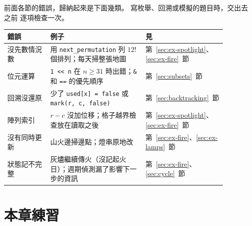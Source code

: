 前面各節的錯誤，歸納起來是下面幾類。 寫枚舉、回溯或模擬的題目時，交出去之前
逐項檢查一次。

\begin{center}
\begin{tabular}{p{0.2\linewidth}p{0.44\linewidth}p{0.24\linewidth}}
\toprule
錯誤 & 例子 & 見 \\
\midrule
沒先數情況數 & 用 \texttt{next\_permutation} 列 $12!$ 個排列；每天掃整張地圖
& 第~\ref{sec:ex-spotlight}、\ref{sec:ex-fire}~節 \\
位元運算 & \texttt{1 << n} 在 $n \ge 31$ 時出錯；\texttt{\&} 和 \texttt{==}
的優先順序 & 第~\ref{sec:subsets}~節 \\
回溯沒還原 & 少了 \texttt{used[x] = false} 或 \texttt{mark(r, c, false)} &
第~\ref{sec:backtracking}~節 \\
陣列索引 & $r - c$ 沒加位移；格子越界檢查放在讀取之後 &
第~\ref{sec:ex-spotlight}、\ref{sec:ex-fire}~節 \\
沒有同時更新 & 山火邊掃邊點；燈串原地改 & 第~\ref{sec:ex-fire}、\ref{sec:ex-lamps}~節 \\
狀態記不完整 & 灰燼繼續傳火（沒記起火日）；週期偵測漏了影響下一步的資訊 &
第~\ref{sec:ex-fire}、\ref{sec:cycle}~節 \\
\bottomrule
\end{tabular}
\end{center}


\section{本章練習}
\label{sec:ch4-exercises}

